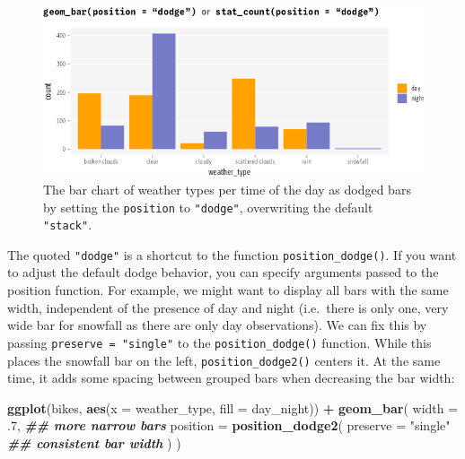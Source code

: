 \documentclass[
]{krantz}
\makeatletter
\newenvironment{Shaded}{\begin{snugshade}}{\end{snugshade}}
\newcommand{\AttributeTok}[1]{\textcolor[rgb]{0.27,0.27,0.27}{#1}}
\newcommand{\DecValTok}[1]{\textcolor[rgb]{0.06,0.06,0.06}{#1}}
\newcommand{\DocumentationTok}[1]{\textcolor[rgb]{0.37,0.37,0.37}{\textbf{\textit{#1}}}}
\newcommand{\FunctionTok}[1]{\textcolor[rgb]{0.27,0.27,0.27}{\textbf{#1}}}
\newcommand{\NormalTok}[1]{#1}
\newcommand{\SpecialCharTok}[1]{\textcolor[rgb]{0.43,0.43,0.43}{\textbf{#1}}}
\newcommand{\StringTok}[1]{\textcolor[rgb]{0.5,0.5,0.5}{#1}}
\newenvironment{kframe}{%
\medskip{}
\setlength{\fboxsep}{.8em}
 \def\at@end@of@kframe{}%
 \ifinner\ifhmode%
  \def\at@end@of@kframe{\end{minipage}}%
  \begin{minipage}{\columnwidth}%
 \fi\fi%
 \def\FrameCommand##1{\hskip\@totalleftmargin \hskip-\fboxsep
 \colorbox{shadecolor}{##1}\hskip-\fboxsep
     \hskip-\linewidth \hskip-\@totalleftmargin \hskip\columnwidth}%
 \MakeFramed {\advance\hsize-\width
   \@totalleftmargin\z@ \linewidth\hsize
   \@setminipage}}%
 {\par\unskip\endMakeFramed%
 \at@end@of@kframe}
\renewenvironment{Shaded}{\begin{kframe}}{\end{kframe}}
\makeatother
\begin{document}
\begin{figure}
\centering
\includegraphics{bookdown_files/figure-latex/07layerPredefinedCustomBars-1.png}
\caption{\label{fig:07layerPredefinedCustomBars}The bar chart of weather types per time of the day as dodged bars by setting the \texttt{position} to \texttt{"dodge"}, overwriting the default \texttt{"stack"}.}
\end{figure}

The quoted \texttt{"dodge"} is a shortcut to the function \texttt{position\_dodge()}. If you want to adjust the default dodge behavior, you can specify arguments passed to the position function. For example, we might want to display all bars with the same width, independent of the presence of day and night (i.e.~there is only one, very wide bar for snowfall as there are only day observations). We can fix this by passing \texttt{preserve\ =\ "single"} to the \texttt{position\_dodge()} function. While this places the snowfall bar on the left, \texttt{position\_dodge2()} centers it. At the same time, it adds some spacing between grouped bars when decreasing the bar width:

\begin{Shaded}
\begin{Highlighting}[]
\FunctionTok{ggplot}\NormalTok{(bikes, }\FunctionTok{aes}\NormalTok{(}\AttributeTok{x =}\NormalTok{ weather\_type, }\AttributeTok{fill =}\NormalTok{ day\_night)) }\SpecialCharTok{+}
  \FunctionTok{geom\_bar}\NormalTok{(}
    \AttributeTok{width =}\NormalTok{ .}\DecValTok{7}\NormalTok{, }\DocumentationTok{\#\# more narrow bars}
    \AttributeTok{position =} \FunctionTok{position\_dodge2}\NormalTok{(}
      \AttributeTok{preserve =} \StringTok{"single"} \DocumentationTok{\#\# consistent bar width}
\NormalTok{    )}
\NormalTok{  )}
\end{Highlighting}
\end{Shaded}
\end{document}
